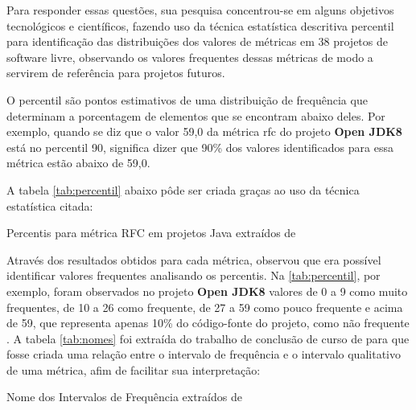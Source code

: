 Para responder essas questões, sua pesquisa concentrou-se em alguns objetivos tecnológicos e científicos, fazendo uso da técnica estatística descritiva percentil para identificação das distribuições dos valores de métricas em 38 projetos de software livre, observando os valores frequentes dessas métricas de modo a servirem de referência para projetos futuros. 

O percentil são pontos estimativos de uma distribuição de frequência que determinam a porcentagem de elementos que se encontram abaixo deles. Por exemplo, quando se diz que o valor 59,0 da métrica rfc do projeto \textbf{Open JDK8} está no percentil 90, significa dizer que 90\% dos valores identificados para essa métrica estão abaixo de 59,0. 

A tabela \ref{tab:percentil} abaixo pôde ser criada graças ao uso da técnica estatística citada:
	
	\begin{table}[!ht]
	\begin{center}
	
	 
	\caption{Percentis para métrica RFC em projetos Java extraídos de  
	}
	\label{tab:percentil}
	\end{center}
	\end{table}	
	\FloatBarrier	

Através dos resultados obtidos para cada métrica,  observou que era possível identificar valores frequentes analisando os percentis. Na \ref{tab:percentil}, por exemplo, foram observados no projeto \textbf{Open JDK8} valores de 0 a 9 como muito frequentes, de 10 a 26 como frequente, de 27 a 59 como pouco frequente e acima de 59, que representa apenas 10\% do código-fonte do projeto, como não frequente \cite{Meirelles2013}. A tabela \ref{tab:nomes} foi extraída do trabalho de conclusão de curso de  para que fosse criada uma relação entre o intervalo de frequência e o intervalo qualitativo de uma métrica, afim de facilitar sua interpretação:

\begin{table}[!ht]
	\begin{center}
	
	\caption{Nome dos Intervalos de Frequência extraídos de }
	\label{tab:nomes}
	\end{center}
	\end{table}
	\FloatBarrier
	

